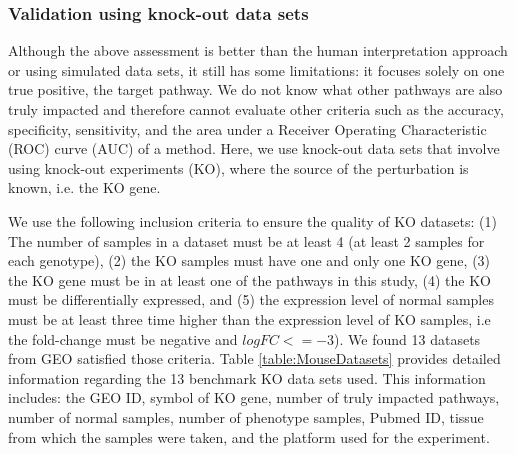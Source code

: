 
\subsubsection{Validation using knock-out data sets}
\label{KOsubsubsection}

Although the above assessment is better than the human interpretation approach or using simulated data sets, it still has some limitations: it focuses solely on one true positive, the target pathway. We do not know what other pathways are also truly impacted and therefore cannot evaluate other criteria such as the accuracy, specificity, sensitivity, and the area under a Receiver Operating Characteristic (ROC) curve (AUC) of a method. Here, we use knock-out data sets that involve using knock-out experiments (KO), where the source of the perturbation is known, i.e. the KO gene.

We use the following inclusion criteria to ensure the quality of KO datasets: (1) The number of samples in a dataset must be at least 4 (at least 2 samples for each genotype), (2) the KO samples must have one and only one KO gene, (3) the KO gene must be in at least one of the pathways in this study, (4) the KO must be differentially expressed, and (5) the expression level of normal samples must be at least three time higher than the expression level of KO samples, i.e the fold-change must be negative and $logFC <= -3$).
We found 13 datasets from GEO satisfied those criteria. Table \ref{table:MouseDatasets} provides detailed information regarding the 13 benchmark KO data sets used. This information includes:  the GEO ID, symbol of KO gene, number of truly impacted pathways, number of normal samples, number of phenotype samples, Pubmed ID, tissue from which the samples were taken, and the platform used for the experiment.


